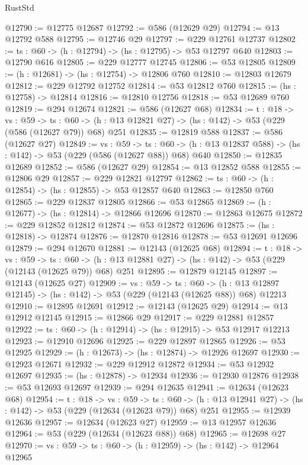\begin{lexlean}{RustStd}
\begin{coremodule}
@12790 := @12775 @12687
@12792 := @586 (@12629 @29)
@12794 := @13 @12792 @588
@12795 := @12746 @29
@12797 := @229 @12761 @12737
@12802 := {ts : @60} -> (h : @12794) -> (hs : @12795) -> @53 @12797 @640
@12803 := @12790 @616
@12805 := @229 @12777 @12745
@12806 := @53 @12805
@12809 := (h : @12681) -> (hs : @12754) -> @12806 @760
@12810 := @12803 @12679
@12812 := @229 @12792 @12752
@12814 := @53 @12812 @760
@12815 := (hs : @12758) -> @12814
@12816 := @12810 @12756
@12818 := @53 @12689 @760
@12819 := @294 @12674
@12821 := @586 (@12627 @68)
@12834 := {t : @18} ->
  {vs : @59} ->
  {ts : @60} -> (h : @13 @12821 @27) -> (hs : @142) -> @53 (@229 (@586 (@12627 @79)) @68) @251
@12835 := @12819 @588
@12837 := @586 (@12627 @27)
@12849 := {vs : @59} ->
  {ts : @60} -> (h : @13 @12837 @588) -> (hs : @142) -> @53 (@229 (@586 (@12627 @88)) @68) @640
@12850 := @12835 @12689
@12852 := @586 (@12627 @29)
@12854 := @13 @12852 @588
@12855 := @12806 @29
@12857 := @229 @12821 @12797
@12862 := {ts : @60} -> (h : @12854) -> (hs : @12855) -> @53 @12857 @640
@12863 := @12850 @760
@12865 := @229 @12837 @12805
@12866 := @53 @12865
@12869 := (h : @12677) -> (hs : @12814) -> @12866 @12696
@12870 := @12863 @12675
@12872 := @229 @12852 @12812
@12874 := @53 @12872 @12696
@12875 := (hs : @12818) -> @12874
@12876 := @12870 @12816
@12878 := @53 @12691 @12696
@12879 := @294 @12670
@12881 := @12143 (@12625 @68)
@12894 := {t : @18} ->
  {vs : @59} ->
  {ts : @60} -> (h : @13 @12881 @27) -> (hs : @142) -> @53 (@229 (@12143 (@12625 @79)) @68) @251
@12895 := @12879 @12145
@12897 := @12143 (@12625 @27)
@12909 := {vs : @59} ->
  {ts : @60} ->
  (h : @13 @12897 @12145) -> (hs : @142) -> @53 (@229 (@12143 (@12625 @88)) @68) @12213
@12910 := @12895 @12691
@12912 := @12143 (@12625 @29)
@12914 := @13 @12912 @12145
@12915 := @12866 @29
@12917 := @229 @12881 @12857
@12922 := {ts : @60} -> (h : @12914) -> (hs : @12915) -> @53 @12917 @12213
@12923 := @12910 @12696
@12925 := @229 @12897 @12865
@12926 := @53 @12925
@12929 := (h : @12673) -> (hs : @12874) -> @12926 @12697
@12930 := @12923 @12671
@12932 := @229 @12912 @12872
@12934 := @53 @12932 @12697
@12935 := (hs : @12878) -> @12934
@12936 := @12930 @12876
@12938 := @53 @12693 @12697
@12939 := @294 @12635
@12941 := @12634 (@12623 @68)
@12954 := {t : @18} ->
  {vs : @59} ->
  {ts : @60} -> (h : @13 @12941 @27) -> (hs : @142) -> @53 (@229 (@12634 (@12623 @79)) @68) @251
@12955 := @12939 @12636
@12957 := @12634 (@12623 @27)
@12959 := @13 @12957 @12636
@12964 := @53 (@229 (@12634 (@12623 @88)) @68)
@12965 := @12698 @27
@12970 := {vs : @59} -> {ts : @60} -> (h : @12959) -> (hs : @142) -> @12964 @12965

\end{coremodule}
\end{lexlean}
